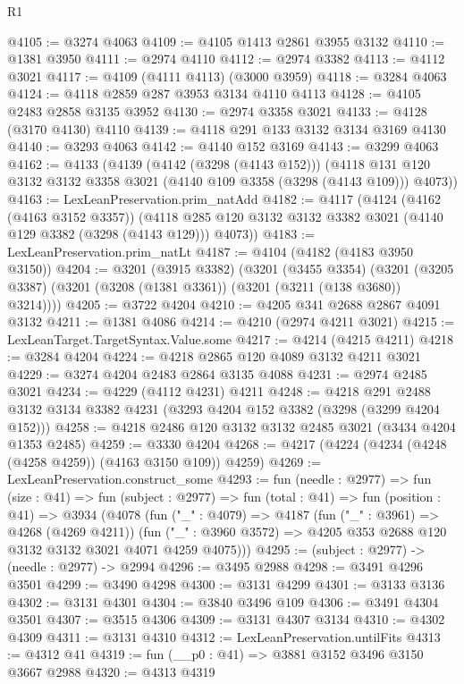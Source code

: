 \begin{lexlean}{R1}
\begin{coremodule}
@4105 := @3274 @4063
@4109 := @4105 @1413 @2861 @3955 @3132
@4110 := @1381 @3950
@4111 := @2974 @4110
@4112 := @2974 @3382
@4113 := @4112 @3021
@4117 := @4109 (@4111 @4113) (@3000 @3959)
@4118 := @3284 @4063
@4124 := @4118 @2859 @287 @3953 @3134 @4110 @4113
@4128 := @4105 @2483 @2858 @3135 @3952
@4130 := @2974 @3358 @3021
@4133 := @4128 (@3170 @4130) @4110
@4139 := @4118 @291 @133 @3132 @3134 @3169 @4130
@4140 := @3293 @4063
@4142 := @4140 @152 @3169
@4143 := @3299 @4063
@4162 := @4133
    (@4139
      (@4142 (@3298 (@4143 @152)))
      (@4118 @131 @120 @3132 @3132 @3358 @3021 (@4140 @109 @3358 (@3298 (@4143 @109))) @4073))
@4163 := LexLeanPreservation.prim_natAdd
@4182 := @4117
    (@4124
      (@4162 (@4163 @3152 @3357))
      (@4118 @285 @120 @3132 @3132 @3382 @3021 (@4140 @129 @3382 (@3298 (@4143 @129))) @4073))
@4183 := LexLeanPreservation.prim_natLt
@4187 := @4104 (@4182 (@4183 @3950 @3150))
@4204 := @3201
    (@3915 @3382)
    (@3201
      (@3455 @3354)
      (@3201 (@3205 @3387) (@3201 (@3208 (@1381 @3361)) (@3201 (@3211 (@138 @3680)) @3214))))
@4205 := @3722 @4204
@4210 := @4205 @341 @2688 @2867 @4091 @3132
@4211 := @1381 @4086
@4214 := @4210 (@2974 @4211 @3021)
@4215 := LexLeanTarget.TargetSyntax.Value.some
@4217 := @4214 (@4215 @4211)
@4218 := @3284 @4204
@4224 := @4218 @2865 @120 @4089 @3132 @4211 @3021
@4229 := @3274 @4204 @2483 @2864 @3135 @4088
@4231 := @2974 @2485 @3021
@4234 := @4229 (@4112 @4231) @4211
@4248 := @4218
    @291
    @2488
    @3132
    @3134
    @3382
    @4231
    (@3293 @4204 @152 @3382 (@3298 (@3299 @4204 @152)))
@4258 := @4218 @2486 @120 @3132 @3132 @2485 @3021 (@3434 @4204 @1353 @2485)
@4259 := @3330 @4204
@4268 := @4217 (@4224 (@4234 (@4248 (@4258 @4259)) (@4163 @3150 @109)) @4259)
@4269 := LexLeanPreservation.construct_some
@4293 := fun (needle : @2977) =>
  fun (size : @41) =>
  fun (subject : @2977) =>
  fun (total : @41) =>
  fun (position : @41) =>
  @3934
    (@4078
      (fun ("_" : @4079) =>
      @4187
        (fun ("_" : @3961) => @4268 (@4269 @4211))
        (fun ("_" : @3960 @3572) => @4205 @353 @2688 @120 @3132 @3132 @3021 @4071 @4259 @4075)))
@4295 := (subject : @2977) -> (needle : @2977) -> @2994
@4296 := @3495 @2988
@4298 := @3491 @4296 @3501
@4299 := @3490 @4298
@4300 := @3131 @4299
@4301 := @3133 @3136
@4302 := @3131 @4301
@4304 := @3840 @3496 @109
@4306 := @3491 @4304 @3501
@4307 := @3515 @4306
@4309 := @3131 @4307 @3134
@4310 := @4302 @4309
@4311 := @3131 @4310
@4312 := LexLeanPreservation.untilFits
@4313 := @4312 @41
@4319 := fun (__p0 : @41) => @3881 @3152 @3496 @3150 @3667 @2988
@4320 := @4313 @4319

\end{coremodule}
\end{lexlean}
